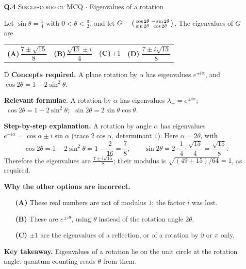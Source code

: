 \documentclass[11pt,a4paper]{article}
\newcommand{\optlabel}[1]{\textbf{(#1)}}
\newcommand{\correctlabel}[1]{\textcolor{okgreen}{\textbf{(#1)}\,\ding{51}}}
\newenvironment{qitem}[1]{\begin{list}{}{\setlength{\leftmargin}{3.3em}\setlength{\labelwidth}{3.1em}%
  \setlength{\labelsep}{0.2em}\setlength{\topsep}{3pt}\setlength{\parsep}{3pt}}\item[\textbf{Q.#1}\hfill]}{\end{list}}
\newcommand{\qsep}{\par\vspace{2pt}{\color{black!15}\hrule}\vspace{4pt}}
\newcommand{\qmeta}[2]{{\footnotesize\color{black!60}\textsc{#1} \;$\cdot$\; #2}\par}
\begin{document}
\begin{qitem}{4}
\qmeta{Single-correct MCQ}{Eigenvalues of a rotation}
Let $\sin\theta = \tfrac14$ with $0 < \theta < \tfrac\pi2$, and let
$G = \begin{psmallmatrix}\cos 2\theta & -\sin 2\theta\\ \sin 2\theta & \cos 2\theta\end{psmallmatrix}$. The eigenvalues of $G$ are
\par\smallskip\noindent\begin{tabularx}{\linewidth}{@{}*{4}{L}@{}}
\optlabel{A}\,$\dfrac{7 \pm \sqrt{15}}{8}$ & \optlabel{B}\,$\dfrac{\sqrt{15} \pm i}{4}$ & \optlabel{C}\,$\pm 1$ & \correctlabel{D}\,$\dfrac{7 \pm i\sqrt{15}}{8}$
\end{tabularx}
\end{qitem}
\begin{solbox}{D}
\textbf{\color{brand}Concepts required.} A plane rotation by $\alpha$ has eigenvalues $e^{\pm i\alpha}$, and $\cos2\theta = 1 - 2\sin^2\theta$.

\textbf{\color{brand}Relevant formulae.} A rotation by $\alpha$ has eigenvalues $\lambda_\pm = e^{\pm i\alpha}$; $\;\cos2\theta = 1 - 2\sin^2\theta$; $\;\sin2\theta = 2\sin\theta\cos\theta$.

\textbf{\color{brand}Step-by-step explanation.} A rotation by angle $\alpha$ has eigenvalues $e^{\pm i\alpha} = \cos\alpha \pm i\sin\alpha$ (trace $2\cos\alpha$, determinant $1$).
Here $\alpha = 2\theta$, with
\[ \cos 2\theta = 1 - 2\sin^2\theta = 1 - \frac{2}{16} = \frac78, \qquad
   \sin 2\theta = 2\cdot\frac14\cdot\frac{\sqrt{15}}{4} = \frac{\sqrt{15}}{8}. \]
Therefore the eigenvalues are $\frac{7 \pm i\sqrt{15}}{8}$; their modulus is $\sqrt{(49 + 15)/64} = 1$, as required.

\textbf{\color{brand}Why the other options are incorrect.}
\begin{itemize}[leftmargin=2.4em, itemsep=1pt, topsep=2pt]
\item[\textbf{(A)}] These real numbers are not of modulus $1$; the factor $i$ was lost.
\item[\textbf{(B)}] These are $e^{\pm i\theta}$, using $\theta$ instead of the rotation angle $2\theta$.
\item[\textbf{(C)}] $\pm1$ are the eigenvalues of a reflection, or of a rotation by $0$ or $\pi$ only.
\end{itemize}
\textbf{\color{brand}Key takeaway.} Eigenvalues of a rotation lie on the unit circle at the rotation angle: quantum counting reads $\theta$ from them.
\end{solbox}
\qsep
\end{document}
